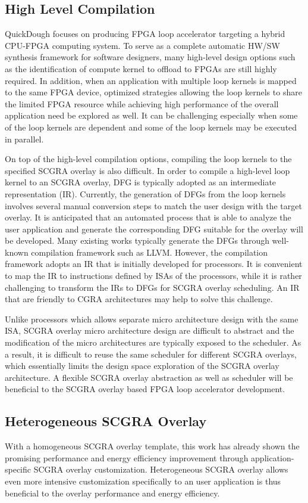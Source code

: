 \subsection{High Level Compilation}
QuickDough focuses on producing FPGA loop accelerator targeting a hybrid CPU-FPGA computing system. To serve as a complete automatic HW/SW synthesis framework for software designers, many high-level design options such as the identification of compute kernel to offload to FPGAs are still highly required. In addition, when an application with multiple loop kernels is mapped to the same FPGA device, optimized strategies allowing the loop kernels to share the limited FPGA resource while achieving high performance of the overall application need be explored as well. It can be challenging especially when some of the loop kernels are dependent and some of the loop kernels may be executed in parallel.

On top of the high-level compilation options, compiling the loop kernels to the specified SCGRA overlay is also difficult. In order to compile a high-level loop kernel to an SCGRA overlay, DFG is typically adopted as an intermediate representation (IR). Currently, the generation of DFGs from the loop kernels involves several manual conversion steps to match the user design with the target overlay. It is anticipated that an automated process that is able to analyze the user application and generate the corresponding DFG suitable for the overlay will be developed. Many existing works typically generate the DFGs through well-known compilation framework such as LLVM. However, the compilation framework adopts an IR that is initially developed for processors. It is convenient to map the IR to instructions defined by ISAs of the processors, while it is rather challenging to transform the IRs to DFGs for SCGRA overlay scheduling. An IR that are friendly to CGRA architectures may help to solve this challenge.

Unlike processors which allows separate micro architecture design with the same ISA, SCGRA overlay micro architecture design are difficult to abstract and the modification of the micro architectures are typically exposed to the scheduler. As a result, it is difficult to reuse the same scheduler for different SCGRA overlays, which essentially limits the design space exploration of the SCGRA overlay architecture. A flexible SCGRA overlay abstraction as well as scheduler will be beneficial to the SCGRA overlay based FPGA loop accelerator development. 

\subsection{Heterogeneous SCGRA Overlay}
With a homogeneous SCGRA overlay template, this work has already shown the promising performance and energy efficiency improvement through application-specific SCGRA overlay customization. Heterogeneous SCGRA overlay allows even more intensive customization specifically to an user application is thus beneficial to the overlay performance and energy efficiency. 

